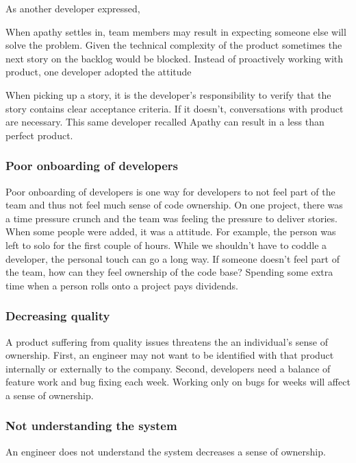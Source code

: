 As another developer expressed, 

When apathy settles in, team members may result in expecting someone else will solve the problem. Given the technical complexity of the product sometimes the next story on the backlog would be blocked. Instead of proactively working with product, one developer adopted the attitude  

When picking up a story, it is the developer's responsibility to verify that the story contains clear acceptance criteria. If it doesn't, conversations with product are necessary. This same developer recalled  Apathy can result in a less than perfect product.

\subsubsection{Poor onboarding of developers}
Poor onboarding of developers is one way for developers to not feel part of the team and thus not feel much sense of code ownership. On one project, there was a time pressure crunch and the team was feeling the pressure to deliver stories. When some people were added, it was a  attitude. For example, the person was left to solo for the first couple of hours. While we shouldn't have to coddle a developer, the personal touch can go a long way. If someone doesn't feel part of the team, how can they feel ownership of the code base?  Spending some extra time when a person rolls onto a project pays dividends. 

\subsubsection{Decreasing quality}
A product suffering from quality issues threatens the an individual's sense of ownership. First, an engineer may not want to be identified with that product internally or externally to the company.  Second,  developers need a balance of feature work and bug fixing each week. Working only on bugs for weeks will affect a sense of ownership.    
 
\subsubsection{Not understanding the system}
An engineer does not understand the system decreases a sense of ownership. 

